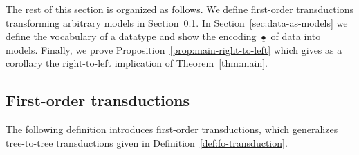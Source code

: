 The rest of this section is organized as follows. We define first-order transductions transforming arbitrary models in Section~\ref{sec:fo-transduction-def}. In Section~\ref{sec:data-as-models} we define the vocabulary of a datatype and show the encoding $\underline{\bullet}$ of data into models. Finally, we prove Proposition~\ref{prop:main-right-to-left} which gives as a corollary the right-to-left implication of Theorem~\ref{thm:main}.

\subsection{First-order transductions}\label{sec:fo-transduction-def}
The following definition introduces first-order transductions, which generalizes tree-to-tree transductions given in Definition~\ref{def:fo-transduction}.  

